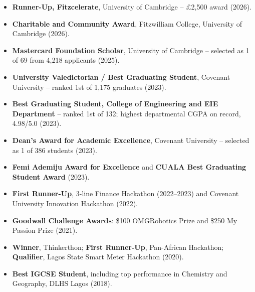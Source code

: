 \begin{itemize}
    \item \textbf{Runner-Up, Fitzcelerate}, University of Cambridge -- £2{,}500 award (2026).
    \item \textbf{Charitable and Community Award}, Fitzwilliam College, University of Cambridge (2026).
    \item \textbf{Mastercard Foundation Scholar}, University of Cambridge -- selected as 1 of 69 from 4{,}218 applicants (2025).
    \item \textbf{University Valedictorian / Best Graduating Student}, Covenant University -- ranked 1st of 1{,}175 graduates (2023).
    \item \textbf{Best Graduating Student, College of Engineering and EIE Department} -- ranked 1st of 132; highest departmental CGPA on record, 4.98/5.0 (2023).
    \item \textbf{Dean's Award for Academic Excellence}, Covenant University -- selected as 1 of 386 students (2023).
    \item \textbf{Femi Ademiju Award for Excellence} and \textbf{CUALA Best Graduating Student Award} (2023).
    \item \textbf{First Runner-Up}, 3-line Finance Hackathon (2022--2023) and Covenant University Innovation Hackathon (2022).
    \item \textbf{Goodwall Challenge Awards}: \$100 OMGRobotics Prize and \$250 My Passion Prize (2021).
    \item \textbf{Winner}, Thinkerthon; \textbf{First Runner-Up}, Pan-African Hackathon; \textbf{Qualifier}, Lagos State Smart Meter Hackathon (2020).
    \item \textbf{Best IGCSE Student}, including top performance in Chemistry and Geography, DLHS Lagos (2018).
\end{itemize}
